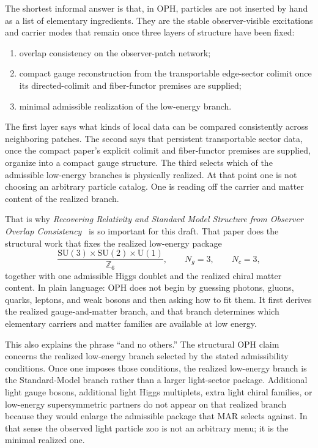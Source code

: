 \documentclass[11pt]{article}
\newcommand{\SU}{\mathrm{SU}}
\newcommand{\U}{\mathrm{U}}
\begin{document}
The shortest informal answer is that, in OPH, particles are not inserted by hand as a list of
elementary ingredients. They are the stable observer-visible excitations and carrier modes that
remain once three layers of structure have been fixed:
\begin{enumerate}[leftmargin=2em]
\item overlap consistency on the observer-patch network;
\item compact gauge reconstruction from the transportable edge-sector colimit once its directed-colimit and fiber-functor premises are supplied;
\item minimal admissible realization of the low-energy branch.
\end{enumerate}
The first layer says what kinds of local data can be compared consistently across neighboring
patches. The second says that persistent transportable sector data, once the compact paper's
explicit colimit and fiber-functor premises are supplied, organize into a compact gauge
structure. The third selects which of the admissible low-energy branches is physically realized.
At that point one is not choosing an arbitrary particle catalog. One is reading off the
carrier and matter content of the realized branch.

That is why \emph{Recovering Relativity and Standard Model Structure from Observer Overlap Consistency}~\cite{ophcompact} is so important for this draft. That paper does
the structural work that fixes the realized low-energy package
\[
\frac{\SU(3)\times\SU(2)\times\U(1)}{\mathbb Z_6},
\qquad
N_g=3,
\qquad
N_c=3,
\]
together with one admissible Higgs doublet and the realized chiral matter content. In plain
language: OPH does not begin by guessing photons, gluons, quarks, leptons, and weak bosons and
then asking how to fit them. It first derives the realized gauge-and-matter branch, and that
branch determines which elementary carriers and matter families are available at low energy.

This also explains the phrase ``and no others.'' The structural OPH claim concerns the realized
low-energy branch selected by the stated admissibility conditions. Once one imposes those
conditions, the realized low-energy branch is the
Standard-Model branch rather than a larger light-sector package. Additional light gauge bosons,
additional light Higgs multiplets, extra light chiral families, or low-energy supersymmetric
partners do not appear on that realized branch because they would enlarge the admissible package
that MAR selects against. In that sense the observed light particle zoo is not an arbitrary menu;
it is the minimal realized one.
\end{document}
